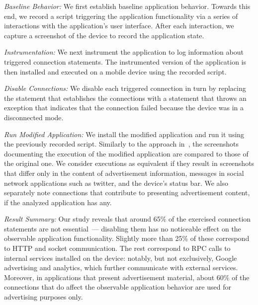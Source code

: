 \vspace{0.05in}
\noindent\emph{Baseline Behavior:} We first establish baseline
application behavior.  Towards this end, we record a
script triggering the application functionality via a series of
interactions with the application's user interface.  After each
interaction, we capture a screenshot of the device to record the
application state.

\vspace{0.05in}
\noindent\emph{Instrumentation:} We next instrument the application to log information
about triggered connection statements. The instrumented version of the application is then
installed and executed on a mobile device using the recorded script.

\vspace{0.05in}
\noindent\emph{Disable Connections:} We disable each triggered connection
in turn by replacing the statement that establishes the connections 
with a statement that throws an exception that indicates that the
connection failed because the device was in a disconnected mode. 

\vspace{0.05in}
\noindent\emph{Run Modified Application:} We install the modified
application and run it using the previously recorded script. 
Similarly to the approach
in~\cite{Hornyack:Han:Jung:Schechter:Wetherall:CCS11}, the
screenshots documenting the execution of the modified application are
compared to those of the original one. We consider executions as
equivalent if they result in screenshots that differ only in the
content of advertisement information, messages in social network
applications such as twitter, and the device's status bar.  We also
separately note connections that contribute to presenting
advertisement content, if the analyzed application has any.

\vspace{0.05in}
\noindent\emph{Result Summary:} Our study reveals that around 65\% of
the exercised connection statements are not essential~--- disabling
them has no noticeable effect on the observable application
functionality.  Slightly more than 25\% of these correspond to HTTP
and socket communication. The rest correspond to RPC calls to internal
services installed on the device: notably, but not exclusively, Google
advertising and analytics, which further communicate with external
services.  Moreover, in applications that present advertisement
material, about 60\% of the connections that do affect the observable
application behavior are used for advertising purposes only.

